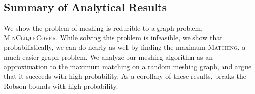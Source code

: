 \subsection{Summary of Analytical Results}
We show the problem of meshing is reducible to a graph problem,
\textsc{MinCliqueCover}.  While solving this problem is infeasible, we
show that probabilistically, we can do nearly as well by finding the
maximum \textsc{Matching}, a much easier graph problem. We analyze our
meshing algorithm as an approximation to the maximum matching on a
random meshing graph, and argue that it succeeds with high
probability.
As a corollary of these results, \Mesh breaks the Robson
bounds with high probability.

